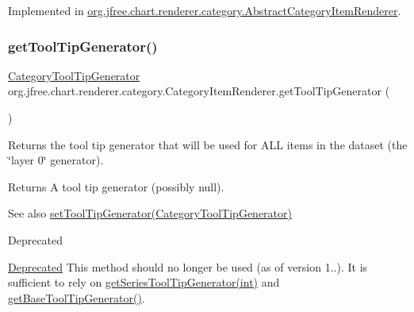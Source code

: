 Implemented in \mbox{\hyperlink{classorg_1_1jfree_1_1chart_1_1renderer_1_1category_1_1_abstract_category_item_renderer_a79d87ce1ccfe15b1be501fd600c46b21}{org.\+jfree.\+chart.\+renderer.\+category.\+Abstract\+Category\+Item\+Renderer}}.

\mbox{\label{interfaceorg_1_1jfree_1_1chart_1_1renderer_1_1category_1_1_category_item_renderer_a887b874ffbaafb55216058196012b320}} 
\subsubsection{\texorpdfstring{get\+Tool\+Tip\+Generator()}{getToolTipGenerator()}\hspace{0.1cm}{\footnotesize\ttfamily [2/2]}}
{\footnotesize\ttfamily \mbox{\hyperlink{interfaceorg_1_1jfree_1_1chart_1_1labels_1_1_category_tool_tip_generator}{Category\+Tool\+Tip\+Generator}} org.\+jfree.\+chart.\+renderer.\+category.\+Category\+Item\+Renderer.\+get\+Tool\+Tip\+Generator (\begin{DoxyParamCaption}{ }\end{DoxyParamCaption})}

Returns the tool tip generator that will be used for A\+LL items in the dataset (the \char`\"{}layer 0\char`\"{} generator).

\begin{DoxyReturn}{Returns}
A tool tip generator (possibly {\ttfamily null}).
\end{DoxyReturn}
\begin{DoxySeeAlso}{See also}
\mbox{\hyperlink{interfaceorg_1_1jfree_1_1chart_1_1renderer_1_1category_1_1_category_item_renderer_a50195768240d15b1a334a49d66aff2e8}{set\+Tool\+Tip\+Generator(\+Category\+Tool\+Tip\+Generator)}}
\end{DoxySeeAlso}
\begin{DoxyRefDesc}{Deprecated}
\item[\mbox{\hyperlink{deprecated__deprecated000168}{Deprecated}}]This method should no longer be used (as of version 1..). It is sufficient to rely on \mbox{\hyperlink{interfaceorg_1_1jfree_1_1chart_1_1renderer_1_1category_1_1_category_item_renderer_a9266001456365d0bfa851db45a7c281f}{get\+Series\+Tool\+Tip\+Generator(int)}} and \mbox{\hyperlink{interfaceorg_1_1jfree_1_1chart_1_1renderer_1_1category_1_1_category_item_renderer_a7645a46ca7fd406133337313e00154aa}{get\+Base\+Tool\+Tip\+Generator()}}. \end{DoxyRefDesc}


